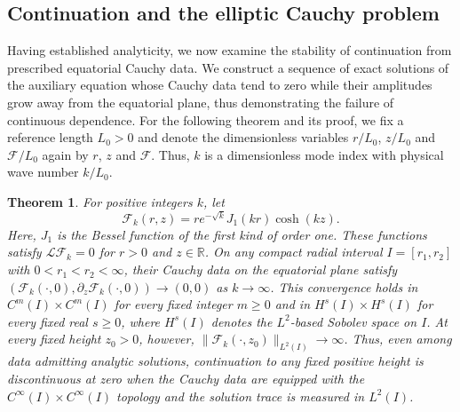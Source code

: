 \documentclass[amsmath,amsfonts,amssymb,aps,pra,superscriptaddress,10pt]{revtex4-2}
\numberwithin{equation}{section}
\theoremstyle{plain}
\newtheorem{theorem}{Theorem}
\theoremstyle{definition}
\theoremstyle{remark}
\theoremstyle{definition}
\begin{document}
\subsection{Continuation and the elliptic Cauchy problem}

Having established analyticity, we now examine the stability of continuation from prescribed equatorial Cauchy data. We construct a sequence of exact solutions of the auxiliary equation whose Cauchy data tend to zero while their amplitudes grow away from the equatorial plane, thus demonstrating the failure of continuous dependence. For the following theorem and its proof, we fix a reference length $L_0>0$ and denote the dimensionless variables $r/L_0$, $z/L_0$ and $\mathcal{F}/L_0$ again by $r$, $z$ and $\mathcal{F}$. Thus, $k$ is a dimensionless mode index with physical wave number $k/L_0$.

\begin{theorem}
For positive integers $k$, let
\begin{equation}\label{Fk}
\mathcal{F}_k(r,z)=re^{-\sqrt{k}}J_1(kr)\cosh{(kz)}.
\end{equation}
Here, $J_1$ is the Bessel function of the first kind of order one.
These functions satisfy $\mathcal{L}\mathcal{F}_k=0$ for $r>0$ and
$z\in\mathbb{R}$. On any compact radial interval $I=[r_1,r_2]$
with $0<r_1<r_2<\infty$, their Cauchy data on the equatorial plane
satisfy $\left(\mathcal{F}_k(\cdot,0),\partial_z\mathcal{F}_k(\cdot,0)\right)
\longrightarrow (0,0)$ as $k\to\infty$. This convergence holds in $C^m(I)\times C^m(I)$ for every fixed integer $m\geq 0$ and in $H^s(I)\times H^s(I)$ for every fixed real $s\geq 0$, where $H^s(I)$ denotes the $L^2$-based Sobolev space on $I$. At every fixed height $z_0>0$, however, $\|\mathcal{F}_k(\cdot,z_0)\|_{L^2(I)}\longrightarrow\infty$. Thus, even among data admitting analytic solutions, continuation
to any fixed positive height is discontinuous at zero when the
Cauchy data are equipped with the $C^\infty(I)\times C^\infty(I)$
topology and the solution trace is measured in $L^2(I)$.
\end{theorem}
\end{document}
